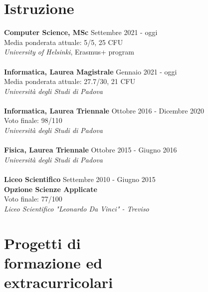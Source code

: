 \documentclass[margin, 10pt]{res}
\begin{document}
\begin{resume}
\section{Istruzione}

\textbf{Computer Science, MSc} \hfill Settembre 2021 - oggi \\
Media ponderata attuale: 5/5, 25 CFU \\
\textit{University of Helsinki}, Erasmus+ program \\ \\
\textbf{Informatica, Laurea Magistrale} \hfill Gennaio 2021 - oggi \\
Media ponderata attuale: 27.7/30, 21 CFU \\
\textit{Università degli Studi di Padova} \\ \\
\textbf{Informatica, Laurea Triennale} \hfill Ottobre 2016 - Dicembre 2020 \\
Voto finale: 98/110 \\
\textit{Università degli Studi di Padova} \\ \\
\textbf{Fisica, Laurea Triennale} \hfill Ottobre 2015 - Giugno 2016 \\
\textit{Università degli Studi di Padova} \\ \\
\textbf{Liceo Scientifico} \hfill Settembre 2010 - Giugno 2015 \\
\textbf{Opzione Scienze Applicate} \\
Voto finale: 77/100 \\
\textit{Liceo Scientifico "Leonardo Da Vinci" - Treviso} 


\section{Progetti di \\ formazione ed \\ extracurricolari}


\end{resume}
\end{document}
